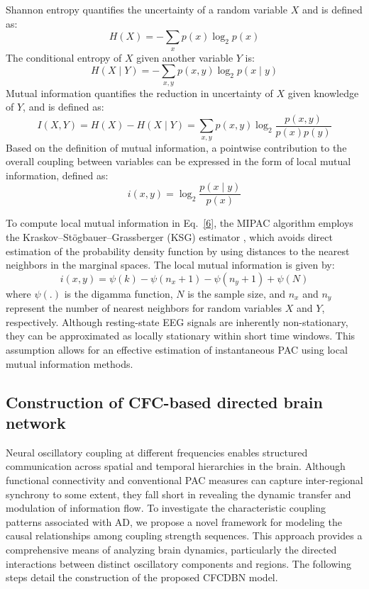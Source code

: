 \documentclass[lettersize,journal]{IEEEtran}
\begin{document}
Shannon entropy quantifies the uncertainty of a random variable \( X \) and is defined as:
\begin{equation}
H(X) = -\sum_{x} p(x) \log_2 p(x)
\label{3}
\end{equation}
The conditional entropy of \( X \) given another variable \( Y \) is:
\begin{equation}
H(X \mid Y) = -\sum_{x, y} p(x, y) \log_2 p(x \mid y)
\label{4}
\end{equation}
Mutual information quantifies the reduction in uncertainty of \( X \) given knowledge of \( Y \), and is defined as:
\begin{equation}
I(X, Y) = H(X) - H(X \mid Y) = \sum_{x, y} p(x, y) \log_2 \frac{p(x, y)}{p(x) p(y)}
\label{5}
\end{equation}
Based on the definition of mutual information, a pointwise contribution to the overall coupling between variables can be expressed in the form of local mutual information, defined as:
\begin{equation}
i(x, y) = \log_2 \frac{p(x \mid y)}{p(x)}
\label{6}
\end{equation}

To compute local mutual information in Eq.~\eqref{6}, the MIPAC algorithm employs the Kraskov–Stögbauer–Grassberger (KSG) estimator \cite{kraskov2004estimating}, which avoids direct estimation of the probability density function by using distances to the nearest neighbors in the marginal spaces. The local mutual information is given by:
\begin{equation}
i(x, y) = \psi(k) - \psi(n_x + 1) - \psi(n_y + 1) + \psi(N)
\label{7}
\end{equation}
where \( \psi(.) \) is the digamma function, \( N \) is the sample size, and \( n_x \) and \( n_y \) represent the number of nearest neighbors for random variables \( X \) and \( Y \), respectively. Although resting-state EEG signals are inherently non-stationary, they can be approximated as locally stationary within short time windows. This assumption allows for an effective estimation of instantaneous PAC using local mutual information methods.

\subsection{ Construction of CFC-based directed brain network  }
Neural oscillatory coupling at different frequencies enables structured communication across spatial and temporal hierarchies in the brain. Although functional connectivity and conventional PAC measures can capture inter-regional synchrony to some extent, they fall short in revealing the dynamic transfer and modulation of information flow. To investigate the characteristic coupling patterns associated with AD, we propose a novel framework for modeling the causal relationships among coupling strength sequences. This approach provides a comprehensive means of analyzing brain dynamics, particularly the directed interactions between distinct oscillatory components and regions. The following steps detail the construction of the proposed CFCDBN model.
\end{document}
